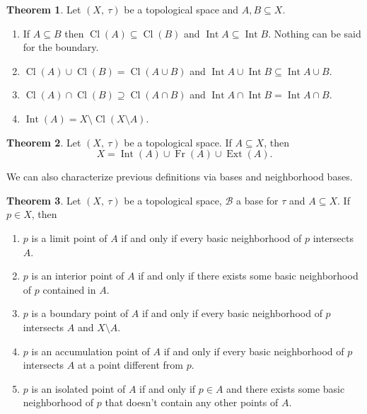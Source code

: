 \documentclass[a4paper]{book}
\theoremstyle{definition}
\newtheorem{theorem}{Theorem}[section]
\theoremstyle{ejemplo}
\theoremstyle{demostracion}
\DeclareMathOperator{\interior}{Int}
\DeclareMathOperator{\exterior}{Ext}
\DeclareMathOperator{\closure}{Cl}
\DeclareMathOperator{\boundary}{Fr}
\begin{document}
\begin{theorem}
	Let $(X,\ \tau)$ be a topological space and $A,B \subseteq X$.
	\begin{enumerate}
		\item
		If $A \subseteq B$ then $\closure(A) \subseteq \closure(B)$ and $\interior{A} \subseteq \interior{B}$. Nothing can be said for the boundary.
		\item
		$\closure(A) \cup \closure(B) = \closure(A \cup B)$ and $\interior{A} \cup \interior{B} \subseteq \interior{A \cup B}$.
		\item
		$\closure(A) \cap \closure(B) \supseteq \closure(A \cap B)$ and $\interior{A} \cap \interior{B} = \interior{A \cap B}$.
		\item
		$\interior(A) = X \setminus \closure(X \setminus A)$.
	\end{enumerate}
\end{theorem}

\begin{theorem}
	Let $(X,\ \tau)$ be a topological space. If $A \subseteq X$, then
	\begin{equation*}
		X = \interior(A) \cup \boundary(A) \cup \exterior(A).		
	\end{equation*}
\end{theorem}

We can also characterize previous definitions via bases and neighborhood bases.

\begin{theorem}
	Let $(X,\ \tau)$ be a topological space, $\mathcal{B}$ a base for $\tau$ and $A \subseteq X$. If $p \in X$, then
	\begin{enumerate}
		\item
		$p$ is a limit point of $A$ if and only if every basic neighborhood of $p$ intersects $A$.
		
		\item
		$p$ is an interior point of $A$ if and only if there exists some basic neighborhood of $p$ contained in $A$.
		
		\item
		$p$ is a boundary point of $A$ if and only if every basic neighborhood of $p$ intersects $A$ and $X \setminus A$.
		
		\item
		$p$ is an accumulation point of $A$ if and only if every basic neighborhood of $p$ intersects $A$ at a point different from $p$.
		
		\item
		$p$ is an isolated point of $A$ if and only if $p \in A$ and there exists some basic neighborhood of $p$ that doesn't contain any other points of $A$.
	\end{enumerate}
\end{theorem}
\end{document}
